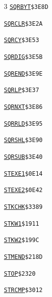 \begin{multicols}{3}
\noindent\hyperlink{l:SQRBYT}{\texttt{SQRBYT}}\hfill\texttt{\$3E8D~\phantom{000}\llap{\pageref{l:SQRBYT}}}\par
\noindent\hyperlink{l:SQRCLR}{\texttt{SQRCLR}}\hfill\texttt{\$3E2A~\phantom{000}\llap{\pageref{l:SQRCLR}}}\par
\noindent\hyperlink{l:SQRCY}{\texttt{SQRCY}}\hfill\texttt{\$3E53~\phantom{000}\llap{\pageref{l:SQRCY}}}\par
\noindent\hyperlink{l:SQRDIG}{\texttt{SQRDIG}}\hfill\texttt{\$3E5B~\phantom{000}\llap{\pageref{l:SQRDIG}}}\par
\noindent\hyperlink{l:SQREND}{\texttt{SQREND}}\hfill\texttt{\$3E9E~\phantom{000}\llap{\pageref{l:SQREND}}}\par
\noindent\hyperlink{l:SQRLP}{\texttt{SQRLP}}\hfill\texttt{\$3E37~\phantom{000}\llap{\pageref{l:SQRLP}}}\par
\noindent\hyperlink{l:SQRNXT}{\texttt{SQRNXT}}\hfill\texttt{\$3E86~\phantom{000}\llap{\pageref{l:SQRNXT}}}\par
\noindent\hyperlink{l:SQRRLD}{\texttt{SQRRLD}}\hfill\texttt{\$3E95~\phantom{000}\llap{\pageref{l:SQRRLD}}}\par
\noindent\hyperlink{l:SQRSHL}{\texttt{SQRSHL}}\hfill\texttt{\$3E90~\phantom{000}\llap{\pageref{l:SQRSHL}}}\par
\noindent\hyperlink{l:SQRSUB}{\texttt{SQRSUB}}\hfill\texttt{\$3E40~\phantom{000}\llap{\pageref{l:SQRSUB}}}\par
\noindent\hyperlink{l:STEXE1}{\texttt{STEXE1}}\hfill\texttt{\$0E14~\phantom{000}\llap{\pageref{l:STEXE1}}}\par
\noindent\hyperlink{l:STEXE2}{\texttt{STEXE2}}\hfill\texttt{\$0E42~\phantom{000}\llap{\pageref{l:STEXE2}}}\par
\noindent\hyperlink{l:STKCHK}{\texttt{STKCHK}}\hfill\texttt{\$3389~\phantom{000}\llap{\pageref{l:STKCHK}}}\par
\noindent\hyperlink{l:STKW1}{\texttt{STKW1}}\hfill\texttt{\$1911~\phantom{000}\llap{\pageref{l:STKW1}}}\par
\noindent\hyperlink{l:STKW2}{\texttt{STKW2}}\hfill\texttt{\$199C~\phantom{000}\llap{\pageref{l:STKW2}}}\par
\noindent\hyperlink{l:STMEND}{\texttt{STMEND}}\hfill\texttt{\$218D~\phantom{000}\llap{\pageref{l:STMEND}}}\par
\noindent\hyperlink{l:STOP}{\texttt{STOP}}\hfill\texttt{\$2320~\phantom{000}\llap{\pageref{l:STOP}}}\par
\noindent\hyperlink{l:STRCMP}{\texttt{STRCMP}}\hfill\texttt{\$3012~\phantom{000}\llap{\pageref{l:STRCMP}}}\par

\end{multicols}
